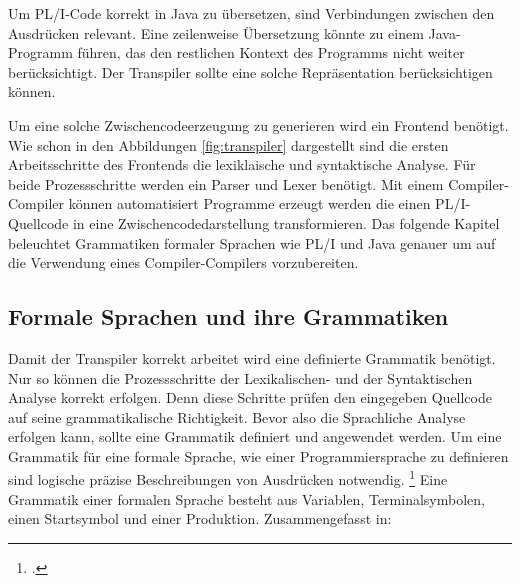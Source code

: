 Um PL/I-Code korrekt in Java zu übersetzen, sind Verbindungen zwischen den Ausdrücken relevant. Eine zeilenweise Übersetzung könnte zu einem Java-Programm führen, das den restlichen Kontext des Programms nicht weiter berücksichtigt. Der Transpiler sollte eine solche Repräsentation berücksichtigen können.

Um eine solche Zwischencodeerzeugung zu generieren wird ein Frontend benötigt. Wie schon in den Abbildungen \ref{fig:transpiler} dargestellt sind die ersten Arbeitsschritte des Frontends die lexiklaische und syntaktische Analyse. Für beide Prozessschritte werden ein Parser und Lexer benötigt. Mit einem Compiler-Compiler können automatisiert Programme erzeugt werden die einen PL/I-Quellcode in eine Zwischencodedarstellung transformieren.
Das folgende Kapitel beleuchtet Grammatiken formaler Sprachen wie PL/I und Java genauer um auf die Verwendung eines Compiler-Compilers vorzubereiten.




\pagebreak
   
   
\subsection{Formale Sprachen und ihre Grammatiken}

Damit der Transpiler korrekt arbeitet wird eine definierte Grammatik benötigt. Nur so können die Prozessschritte der Lexikalischen- und der Syntaktischen Analyse korrekt erfolgen. Denn diese Schritte prüfen den eingegeben Quellcode auf seine grammatikalische Richtigkeit. Bevor also die Sprachliche Analyse erfolgen kann, sollte eine Grammatik definiert und angewendet werden. Um eine Grammatik für eine formale Sprache, wie einer Programmiersprache zu definieren sind logische präzise Beschreibungen von Ausdrücken notwendig. \footcite[Vgl. ][S. 149ff. ]{automata} 
Eine Grammatik einer formalen Sprache besteht aus Variablen, Terminalsymbolen, einen Startsymbol und einer Produktion. Zusammengefasst in:

